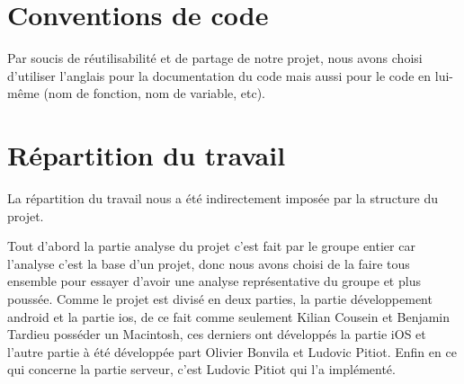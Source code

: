 \section{Conventions de code}
	Par soucis de réutilisabilité et de partage de notre projet, nous avons choisi d'utiliser l'anglais pour la documentation du code mais aussi pour le code en lui-même (nom de fonction, nom de variable, etc).


\section{Répartition du travail}
	La répartition du travail nous a été indirectement imposée par la structure du projet. 
	
	Tout d'abord la partie analyse du projet c'est fait par le groupe entier car
	l'analyse c'est la base d'un projet, donc nous avons choisi de la faire tous ensemble pour essayer d'avoir une analyse représentative du groupe et plus poussée. Comme le projet est divisé en deux parties, la partie développement \gls{android} et la partie \gls{ios}, de ce fait comme seulement Kilian Cousein et Benjamin Tardieu posséder un Macintosh, ces derniers ont développés la partie iOS et l'autre partie à été développée part Olivier Bonvila et Ludovic Pitiot. Enfin en ce qui concerne la partie serveur, c'est Ludovic Pitiot qui l'a implémenté.
	
	
